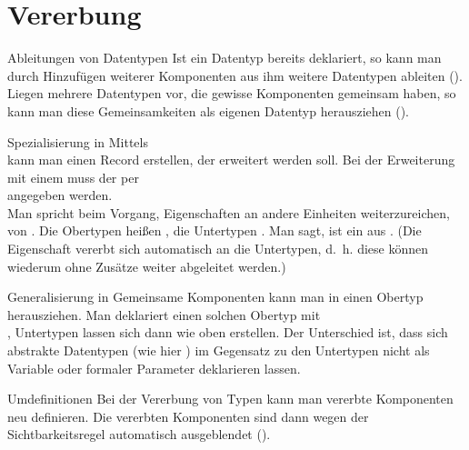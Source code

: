 \pagebreak

\section{%
    Vererbung%
}

\begin{Def}{Ableitungen von Datentypen}
    Ist ein Datentyp bereits deklariert, so kann man durch Hinzufügen weiterer
    Komponenten aus ihm weitere Datentypen ableiten
    (). \\
    Liegen mehrere Datentypen vor, die gewisse Komponenten gemeinsam haben, so
    kann man diese Gemeinsamkeiten als eigenen Datentyp herausziehen
    ().
\end{Def}

\begin{Def}{Spezialisierung in \Ada{}}
    Mittels  \\
    kann man einen Record erstellen, der erweitert werden soll.
    Bei der Erweiterung mit einem  muss der
     per \\
     angegeben werden. \\
    Man spricht beim Vorgang, Eigenschaften an andere Einheiten
    weiterzureichen, von .
    Die Obertypen heißen , die Untertypen .
    Man sagt,  ist ein aus 
    .
    (Die Eigenschaft  vererbt sich automatisch an die
    Untertypen, d.~h. diese können wiederum ohne Zusätze weiter abgeleitet
    werden.)
\end{Def}

\begin{Def}{Generalisierung in \Ada{}}
    Gemeinsame Komponenten kann man in einen Obertyp herausziehen.
    Man deklariert einen solchen Obertyp mit \\
    ,
    Untertypen lassen sich dann wie oben erstellen.
    Der Unterschied ist, dass sich abstrakte Datentypen (wie hier
    ) im Gegensatz zu den Untertypen nicht als Variable oder
    formaler Parameter deklarieren lassen.
\end{Def}

\begin{Def}{Umdefinitionen}
    Bei der Vererbung von Typen kann man vererbte Komponenten neu definieren.
    Die vererbten Komponenten sind dann wegen der Sichtbarkeitsregel
    automatisch ausgeblendet ().
\end{Def}

